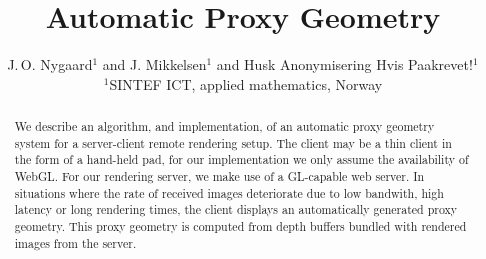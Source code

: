

\title[Automatic Proxy Geometry]%
      {Automatic Proxy Geometry}

\author[J.\,O. Nygaard \& J. Mikkelsen]
       {J.\,O. Nygaard$^{1}$
        and J. Mikkelsen$^{1}$
        and Husk Anonymisering Hvis Paakrevet!$^{1}$
        \\
         $^1$SINTEF ICT, applied mathematics, Norway
       }


%





\maketitle

\begin{abstract}
   We describe an algorithm, and implementation, of an automatic proxy geometry
   system for a server-client remote rendering setup. The client may be a thin
   client in the form of a hand-held pad, for our implementation we only assume
   the availability of WebGL. For our rendering server, we make use of a
   GL-capable web server. In situations where the rate of received images
   deteriorate due to low bandwith, high latency or long rendering times, the
   client displays an automatically generated proxy geometry. This proxy
   geometry is computed from depth buffers bundled with rendered images from the
   server.

\begin{classification} %
\end{classification}

\end{abstract}




